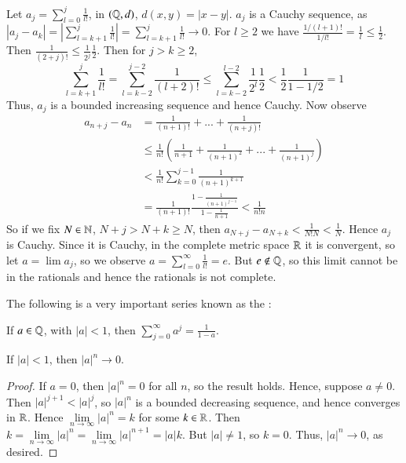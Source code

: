 \begin{example}
    Let $a_j = \sum_{l=0}^j\frac{1}{l!}$, in $(\mathbb Q, d)$, $d(x,y) = |x-y|$. $a_j$ is a Cauchy sequence, as $|a_j - a_k| = \left|\sum_{l=k+1}^j\frac{1}{l!}\right| = \sum_{l=k+1}^j\frac{1}{l!}\rightarrow 0$. For $l\geq 2$ we have $\frac{1/(l+1)!}{1/l!} = \frac{1}{l} \leq \frac{1}{2}$. Then $\frac{1}{(2+j)!} \leq \frac{1}{2^j}\frac{1}{2}$. Then for $j > k \geq 2$, $$\sum_{l=k+1}^j\frac{1}{l!} = \sum_{l=k-2}^{j-2}\frac{1}{(l+2)!} \leq \sum_{l=k-2}^{l-2}\frac{1}{2^l}\frac{1}{2} < \frac{1}{2}\frac{1}{1-1/2} = 1$$ Thus, $a_j$ is a bounded increasing sequence and hence Cauchy. Now observe \begin{align*}
        a_{n+j}-a_n &= \frac{1}{(n+1)!} + ... + \frac{1}{(n+j)!} \\
        &\leq \frac{1}{n!}\left(\frac{1}{n+1}+ \frac{1}{(n+1)^2} + ... + \frac{1}{(n+1)^j}\right) \\
        &< \frac{1}{n!}\sum_{k=0}^{j-1}\frac{1}{(n+1)^{k+1}} \\
        &= \frac{1}{(n+1)!}\frac{1-\frac{1}{(n+1)^{j-1}}}{1-\frac{1}{n+1}} < \frac{1}{n!n}
    \end{align*}
    So if we fix $N \in \mathbb N$, $N+j > N+k \geq N$, then $a_{N+j} - a_{N+k} < \frac{1}{N!N} < \frac{1}{N}$. Hence $a_j$ is Cauchy. Since it is Cauchy, in the complete metric space $\mathbb R$ it is convergent, so let $a = \lim a_j$, so we observe $a = \sum_{l=0}^{\infty}\frac{1}{l!} = e$. But $e \notin \mathbb Q$, so this limit cannot be in the rationals and hence the rationals is not complete. 
\end{example}

The following is a very important series known as the :

\begin{proposition}
    If $a \in \mathbb Q$, with $|a| < 1$, then $\sum_{j=0}^{\infty}a^j = \frac{1}{1-a}$.
\end{proposition}

\begin{proposition}
    If $|a| < 1$, then $|a|^n\rightarrow 0$.
\end{proposition}
\begin{proof}
    If $a = 0$, then $|a|^n = 0$ for all $n$, so the result holds. Hence, suppose $a \neq 0$. Then $|a|^{j+1} < |a|^j$, so $|a|^n$ is a bounded decreasing sequence, and hence converges in $\mathbb R$. Hence $\lim\limits_{n\rightarrow \infty}|a|^n = k$ for some $k \in \mathbb R$. Then $k = \lim\limits_{n\rightarrow \infty}|a|^n = \lim\limits_{n\rightarrow \infty}|a|^{n+1} = |a|k$. But $|a| \neq 1$, so $k = 0$. Thus, $|a|^n\rightarrow 0$, as desired.
\end{proof}


